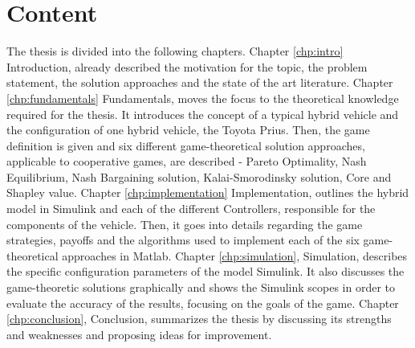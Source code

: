 \section{Content}
The thesis is divided into the following chapters. Chapter \ref{chp:intro} Introduction, already described the motivation for the topic, the problem statement, the solution approaches and the state of the art literature. Chapter \ref{chp:fundamentals} Fundamentals, moves the focus to the theoretical knowledge required for the thesis. It introduces the concept of a typical hybrid vehicle and the configuration of one hybrid vehicle, the Toyota Prius. Then, the game definition is given and six different game-theoretical solution approaches, applicable to cooperative games, are described - Pareto Optimality, Nash Equilibrium, Nash Bargaining solution, Kalai-Smorodinsky solution, Core and Shapley value. Chapter \ref{chp:implementation} Implementation, outlines the hybrid model in Simulink and each of the different Controllers, responsible for the components of the vehicle. Then, it goes into details regarding the game strategies, payoffs and the algorithms used to implement each of the six game-theoretical approaches in Matlab. Chapter \ref{chp:simulation}, Simulation, describes the specific configuration parameters of the model Simulink. It also discusses the game-theoretic solutions graphically and shows the Simulink scopes in order to evaluate the accuracy of the results, focusing on the goals of the game. Chapter \ref{chp:conclusion}, Conclusion, summarizes the thesis by discussing its strengths and weaknesses and proposing ideas for improvement.